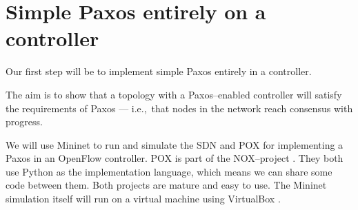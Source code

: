 \chapter{Simple Paxos entirely on a controller}

Our first step will be to implement simple Paxos \cite{Lam01} entirely in a
controller.

The aim is to show that a topology with a Paxos--enabled controller will
satisfy the requirements of Paxos --- i.e.,~that nodes in the network reach
consensus with progress.

We will use Mininet \cite{Lantz:2010:NLR:1868447.1868466} to run and
simulate the \ac{SDN} and POX \cite{POX.1} for implementing a Paxos in an
OpenFlow controller.  POX is part of the NOX--project
\cite{Gude:2008:NTO:1384609.1384625}.  They both use Python as the
implementation language, which means we can share some code between them.
Both projects are mature and easy to use.  The Mininet simulation itself
will run on a virtual machine using VirtualBox
\cite{Watson:2008:VBB:1344209.1344210}.
